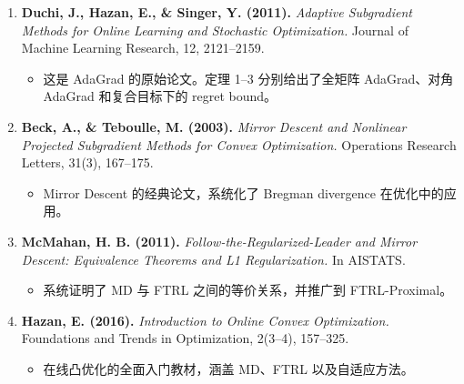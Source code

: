 \documentclass[12pt,a4paper]{ctexart}
\theoremstyle{definition}
\theoremstyle{plain}
\theoremstyle{remark}
\begin{document}
\begin{enumerate}
  \item \textbf{Duchi, J., Hazan, E., \& Singer, Y. (2011).}
  \textit{Adaptive Subgradient Methods for Online Learning and Stochastic Optimization.}
  Journal of Machine Learning Research, 12, 2121–2159.
  \begin{itemize}
    \item 这是 AdaGrad 的原始论文。定理 1–3 分别给出了全矩阵 AdaGrad、对角 AdaGrad 和复合目标下的 regret bound。
  \end{itemize}

  \item \textbf{Beck, A., \& Teboulle, M. (2003).}
  \textit{Mirror Descent and Nonlinear Projected Subgradient Methods for Convex Optimization.}
  Operations Research Letters, 31(3), 167–175.
  \begin{itemize}
    \item Mirror Descent 的经典论文，系统化了 Bregman divergence 在优化中的应用。
  \end{itemize}

  \item \textbf{McMahan, H. B. (2011).}
  \textit{Follow-the-Regularized-Leader and Mirror Descent: Equivalence Theorems and L1 Regularization.}
  In AISTATS.
  \begin{itemize}
    \item 系统证明了 MD 与 FTRL 之间的等价关系，并推广到 FTRL-Proximal。
  \end{itemize}

  \item \textbf{Hazan, E. (2016).}
  \textit{Introduction to Online Convex Optimization.}
  Foundations and Trends in Optimization, 2(3–4), 157–325.
  \begin{itemize}
    \item 在线凸优化的全面入门教材，涵盖 MD、FTRL 以及自适应方法。
  \end{itemize}
\end{enumerate}
\end{document}
